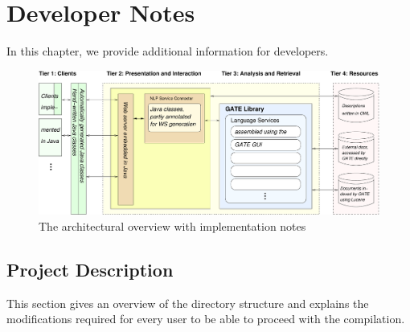 

   
 

\chapter{Developer Notes}
\label{chap:dev}
In this chapter, we provide additional information for developers. 
\begin{figure}[t]
  \centering
  \includegraphics[width=\textwidth]{pictures/arch_impl}
  \caption{The architectural overview with implementation notes}
  \label{fig:arch_impl}
\end{figure}

\section{Project Description}
This section gives an overview of the directory structure and explains the modifications
required for every user to be able to proceed with the compilation.

